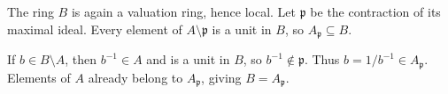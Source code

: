 The ring $B$ is again a valuation ring, hence local. Let $\mathfrak{p}$ be the contraction of its maximal ideal. Every element of $A\setminus\mathfrak{p}$ is a unit in $B$, so $A_{\mathfrak{p}}\subseteq B$.

If $b\in B\setminus A$, then $b^{-1}\in A$ and is a unit in $B$, so $b^{-1}\notin\mathfrak{p}$. Thus $b=1/b^{-1}\in A_{\mathfrak{p}}$. Elements of $A$ already belong to $A_{\mathfrak{p}}$, giving $B=A_{\mathfrak{p}}$.
